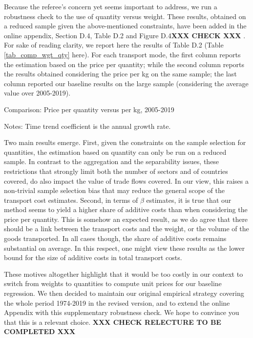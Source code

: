 \documentclass[a4paper,11pt]{article}
\begin{document}
Because the referee's concern yet seems important to address, we run a robustness check to the use of quantity versus weight. These results, obtained on a reduced sample given the above-mentioned constraints, have been added in the online appendix, Section D.4, Table D.2 and Figure D.4\textbf{XXX CHECK XXX }. For sake of reading clarity, we report here the results of Table D.2 (Table \ref{tab_comp_wgt_qty} here). For each transport mode, the first column reports the estimation based on the price per quantity; while the second column reports the results obtained considering the price per kg on the same sample; the last column reported our baseline results on the large sample (considering the average value over 2005-2019).

\begin{table}[htbp]
	\caption{Comparison: Price per quantity versus per kg, 2005-2019}
	\begin{center}		
		
	
{\parbox[l]{12cm}{ \vspace{4pt}\footnotesize{Notes: Time trend coefficient is the annual growth rate.}}}
\end{center}
	\label{tab_comp_wgt_qty}%
\end{table}%


Two main results emerge. First, given the constraints on the sample selection for quantities, the estimation based on quantity can only be run on a reduced sample. In contrast to the aggregation and the separability issues, these restrictions that strongly limit both the number of sectors and of countries covered, do also impact the value of trade flows covered. In our view, this raises a non-trivial sample selection bias that may reduce the general scope of the transport cost estimates. Second, in terms of $\beta$ estimates, it is true that our method seems to yield a higher share of additive costs than when considering the price per quantity. This is somehow an expected result, as we do agree that there should be a link between the transport costs and the weight, or the volume of the goods transported. In all cases though, the share of additive costs remains substantial on average. In this respect, one might view these results as the lower bound for the size of additive costs in total transport costs.\smallskip


These motives altogether highlight that it would be too costly in our context to switch from weights to quantities to compute unit prices for our baseline regression. We then decided to maintain our original empirical strategy covering the whole period 1974-2019 in the revised version, and to extend the online Appendix with this supplementary robustness check. We hope to convince you that this is a relevant choice. \textbf{XXX CHECK RELECTURE TO BE COMPLETED XXX}
\end{document}
